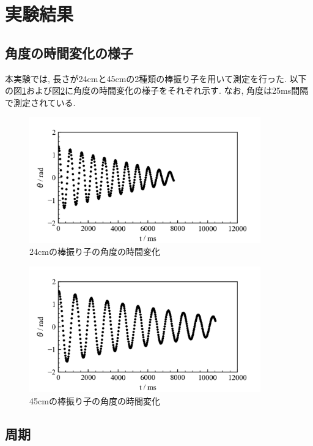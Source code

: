 \documentclass{jarticle}
\begin{document}
\section{実験結果}


\subsection{角度の時間変化の様子}

本実験では, 長さが24cmと45cmの2種類の棒振り子を用いて測定を行った.
以下の図\ref{fg:24cm-graph}および図\ref{fg:45cm-graph}に角度の時間変化の様子をそれぞれ示す.
なお, 角度は25ms間隔で測定されている.

\begin{figure}[H]
  \begin{center}
    \includegraphics[width=100mm]{24cm_graph.png}
    \caption{24cmの棒振り子の角度の時間変化}
    \label{fg:24cm-graph}
  \end{center}
\end{figure}

\begin{figure}[H]
  \begin{center}
    \includegraphics[width=100mm]{45cm_graph.png}
    \caption{45cmの棒振り子の角度の時間変化}
    \label{fg:45cm-graph}
  \end{center}
\end{figure}


\subsection{周期}
\end{document}
